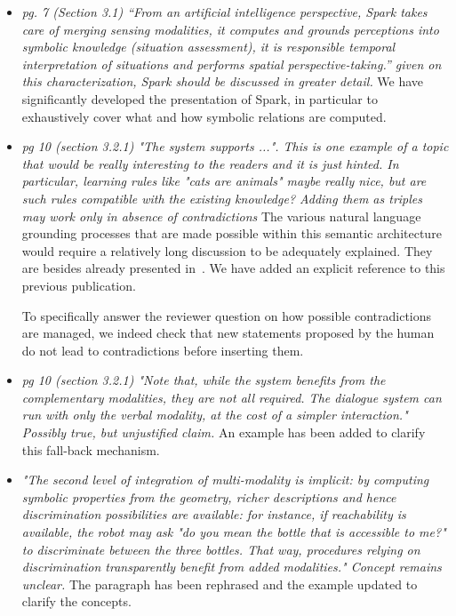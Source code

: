 \documentclass{article}
\begin{document}
\begin{itemize}

    \item \emph{pg. 7 (Section 3.1) ``From an artificial intelligence
            perspective, Spark takes care of merging sensing modalities, it
            computes and grounds perceptions into symbolic knowledge (situation
            assessment), it is responsible temporal interpretation of situations
            and performs spatial perspective-taking.'' given on this
        characterization, Spark should be discussed in greater detail.} We have
        significantly developed the presentation of {\sc Spark}, in
        particular to exhaustively cover what and how symbolic relations are
        computed.

    \item \emph{pg 10 (section 3.2.1)
            "The system supports ...". This is one example of a topic that would
            be really interesting to the readers and it is just hinted. In
            particular, learning rules like "cats are animals" maybe really
            nice, but are such rules compatible with the existing knowledge?
            Adding them as triples may work only in absence of contradictions} The
            various natural language grounding processes that are made possible
            within this semantic
            architecture would require a relatively long discussion to be adequately
            explained. They are besides already presented in~\cite{Lemaignan2011a}.
            We have added an explicit reference to this previous publication.

            To specifically answer the reviewer question on how possible
            contradictions are managed, we indeed check that new statements proposed
            by the human do not lead to contradictions before inserting them.

    \item \emph{pg 10 (section 3.2.1)
            "Note that, while the system benefits from the complementary
            modalities, they are not all
            required. The dialogue system can run with only the verbal modality,
            at the cost of a simpler interaction."
        Possibly true, but unjustified claim.} An example has been added to
        clarify this fall-back mechanism.

    \item \emph{"The second level of integration of multi-modality is implicit:
            by computing symbolic properties 
            from the geometry, richer descriptions and hence discrimination
            possibilities are available: 
            for instance, if reachability is available, the robot may ask "do
            you mean the bottle that is 
            accessible to me?" to discriminate between the three bottles. That
            way, procedures relying on 
            discrimination transparently benefit from added modalities." Concept
            remains unclear.} The paragraph has been rephrased and the example
            updated to clarify the concepts.


\end{itemize}
\end{document}
